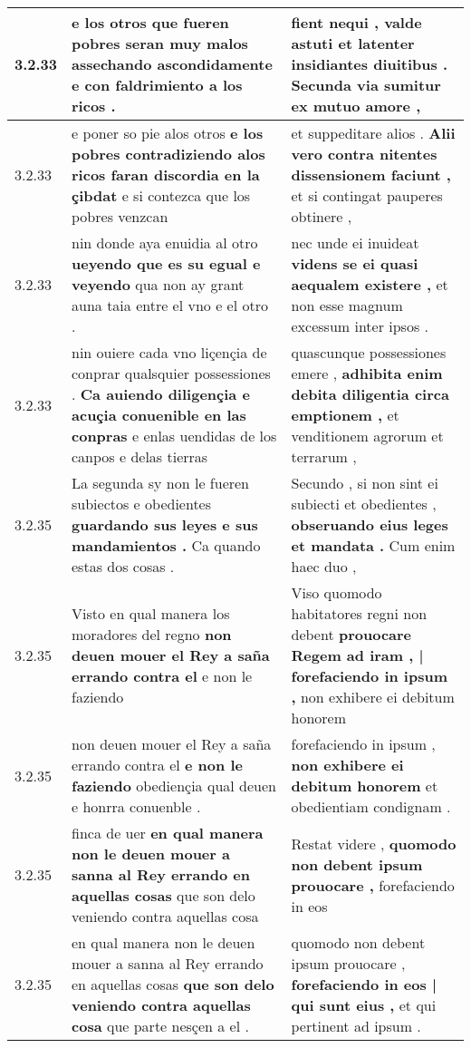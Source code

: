 \begin{tabular}{|p{1cm}|p{6.5cm}|p{6.5cm}|}
3.2.33 & e los otros que fueren pobres seran muy malos \textbf{ assechando ascondidamente } e con faldrimiento a los ricos . & fient nequi , \textbf{ valde astuti et latenter insidiantes diuitibus . } Secunda via sumitur ex mutuo amore , \\\hline
3.2.33 & e poner so pie alos otros \textbf{ e los pobres contradiziendo alos ricos faran discordia en la çibdat } e si contezca que los pobres venzcan & et suppeditare alios . \textbf{ Alii vero contra nitentes dissensionem faciunt , } et si contingat pauperes obtinere , \\\hline
3.2.33 & nin donde aya enuidia al otro \textbf{ ueyendo que es su egual e veyendo } qua non ay grant auna taia entre el vno e el otro . & nec unde ei inuideat \textbf{ videns se ei quasi aequalem existere , } et non esse magnum excessum inter ipsos . \\\hline
3.2.33 & nin ouiere cada vno liçençia de conprar qualsquier possessiones . \textbf{ Ca auiendo diligençia e acuçia conuenible en las conpras } e enlas uendidas de los canpos e delas tierras & quascunque possessiones emere , \textbf{ adhibita enim debita diligentia circa emptionem , } et venditionem agrorum et terrarum , \\\hline
3.2.35 & La segunda sy non le fueren subiectos e obedientes \textbf{ guardando sus leyes e sus mandamientos . } Ca quando estas dos cosas . & Secundo , si non sint ei subiecti et obedientes , \textbf{ obseruando eius leges et mandata . } Cum enim haec duo , \\\hline
3.2.35 & Visto en qual manera los moradores del regno \textbf{ non deuen mouer el Rey a saña errando contra el } e non le faziendo & Viso quomodo habitatores regni non debent \textbf{ prouocare Regem ad iram , | forefaciendo in ipsum , } non exhibere ei debitum honorem \\\hline
3.2.35 & non deuen mouer el Rey a saña errando contra el \textbf{ e non le faziendo } obediençia qual deuen e honrra conuenble . & forefaciendo in ipsum , \textbf{ non exhibere ei debitum honorem } et obedientiam condignam . \\\hline
3.2.35 & finca de uer \textbf{ en qual manera non le deuen mouer a sanna al Rey errando en aquellas cosas } que son delo veniendo contra aquellas cosa & Restat videre , \textbf{ quomodo non debent ipsum prouocare , } forefaciendo in eos \\\hline
3.2.35 & en qual manera non le deuen mouer a sanna al Rey errando en aquellas cosas \textbf{ que son delo veniendo contra aquellas cosa } que parte nesçen a el . & quomodo non debent ipsum prouocare , \textbf{ forefaciendo in eos | qui sunt eius , } et qui pertinent ad ipsum . \\\hline

\end{tabular}
